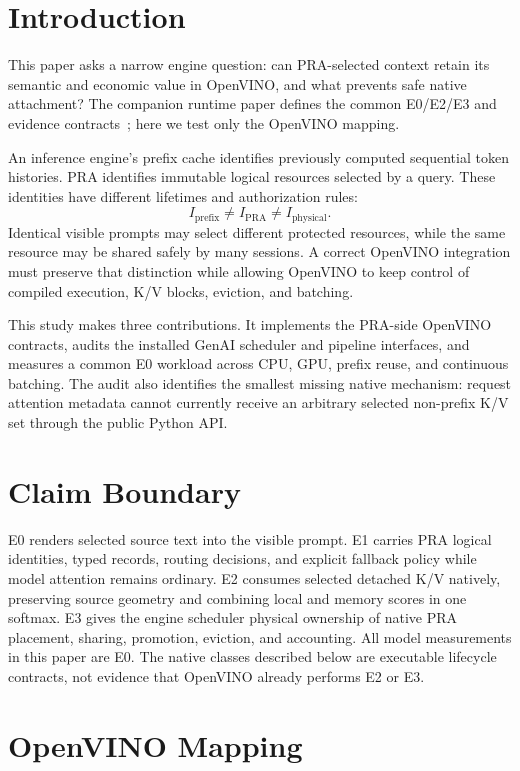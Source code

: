 \documentclass[10pt]{article}
\begin{document}
\section{Introduction}
This paper asks a narrow engine question: can PRA-selected context retain its
semantic and economic value in OpenVINO, and what prevents safe native
attachment? The companion runtime paper defines the common E0/E2/E3 and
evidence contracts~\cite{praruntime}; here we test only the OpenVINO mapping.

An inference engine's prefix cache identifies previously computed sequential
token histories. PRA identifies immutable logical resources selected by a
query. These identities have different lifetimes and authorization rules:
\[
I_{\mathrm{prefix}} \ne I_{\mathrm{PRA}} \ne I_{\mathrm{physical}}.
\]
Identical visible prompts may select different protected resources, while the
same resource may be shared safely by many sessions. A correct OpenVINO
integration must preserve that distinction while allowing OpenVINO to keep
control of compiled execution, K/V blocks, eviction, and batching.

This study makes three contributions. It implements the PRA-side OpenVINO
contracts, audits the installed GenAI scheduler and pipeline interfaces, and
measures a common E0 workload across CPU, GPU, prefix reuse, and continuous
batching. The audit also identifies the smallest missing native mechanism:
request attention metadata cannot currently receive an arbitrary selected
non-prefix K/V set through the public Python API.

\section{Claim Boundary}
E0 renders selected source text into the visible prompt. E1 carries PRA
logical identities, typed records, routing decisions, and explicit fallback
policy while model attention remains ordinary. E2 consumes selected detached
K/V natively, preserving source geometry and combining local and memory scores
in one softmax. E3 gives the engine scheduler physical ownership of native PRA
placement, sharing, promotion, eviction, and accounting. All model
measurements in this paper are E0. The native classes described below are
executable lifecycle contracts, not evidence that OpenVINO already performs
E2 or E3.

\section{OpenVINO Mapping}
\end{document}
